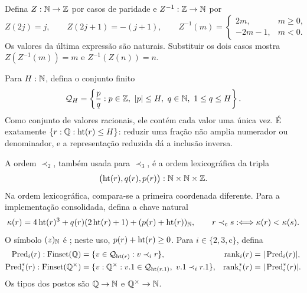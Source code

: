 \begin{definicao}\label{map:normalizacao:4.3}
Defina $Z:\mathbb N\to\mathbb Z$ por casos de paridade e $Z^{-1}:\mathbb Z\to\mathbb N$ por
\[
 Z(2j)=j,\qquad Z(2j+1)=-(j+1),\qquad
 Z^{-1}(m)=\begin{cases}2m,&m\ge0,\\-2m-1,&m<0.\end{cases}
\]
Os valores da última expressão são naturais. Substituir os dois casos
mostra $Z(Z^{-1}(m))=m$ e $Z^{-1}(Z(n))=n$.
\end{definicao}

\begin{definicao}\label{map:normalizacao:4.4}\label{normalizacao:def:rank}
Para $H:\mathbb N$, defina o conjunto finito
\[
 \mathcal Q_H=
 \left\{\frac{p}{q}:p\in\mathbb Z,\ |p|\le H,
                         \ q\in\mathbb N,\ 1\le q\le H\right\}.
\]
Como conjunto de valores racionais, ele contém cada valor uma única
vez. É exatamente $\{r:\mathbb Q:\operatorname{ht}(r)\le H\}$: reduzir uma fração não
amplia numerador ou denominador, e a representação reduzida dá a
inclusão inversa.

A ordem $\prec_2$, também usada para $\prec_3$, é a ordem
lexicográfica da tripla
\[
 \bigl(\operatorname{ht}(r),q(r),p(r)\bigr):\mathbb N\times\mathbb N\times\mathbb Z.
\]
Na ordem lexicográfica, compara-se a primeira coordenada diferente.
Para a implementação consolidada, defina a chave natural
\[
 \kappa(r)=4\operatorname{ht}(r)^3+q(r)(2\operatorname{ht}(r)+1)
                  +(p(r)+\operatorname{ht}(r))_{\mathbb N},
 \qquad r\prec_{\rm c}s:\Longleftrightarrow\kappa(r)<\kappa(s).
\]
O símbolo $(z)_{\mathbb N}$ é ; neste uso,
$p(r)+\operatorname{ht}(r)\ge0$.
Para $i\in\{2,3,\mathrm c\}$, defina
\begin{align*}
 \pred_i(r):\FS(\Q)&=\{v\in\mathcal Q_{\htq(r)}:v\prec_i r\},
 &\rankq_i(r)&=|\pred_i(r)|,\\
 \pred_i^*(r):\FS(\qstar)&=\{v:\qstar:v.1\in\mathcal Q_{\htq(r.1)},\ v.1\prec_i r.1\},
 &\rankq_i^*(r)&=|\pred_i^*(r)|.
\end{align*}
Os tipos dos postos são $\mathbb Q\to\mathbb N$ e $\mathbb Q^{\times}\to\mathbb N$.
\end{definicao}


